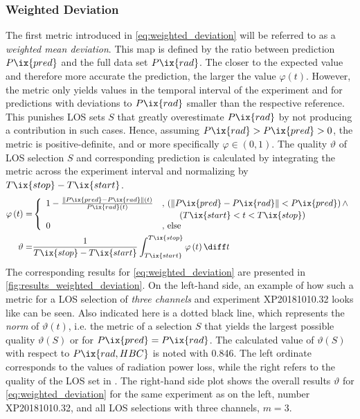            \subsubsection*{Weighted Deviation}%
%
                The first metric introduced in \cref{eq:weighted_deviation} will be referred to as a \textit{weighted mean deviation}. This map is defined by the ratio between prediction $P\ix{pred}$ and the full data set $P\ix{rad}$. The closer to the expected value and therefore more accurate the prediction, the larger the value $\varphi\left(t\right)$. However, the metric only yields values in the temporal interval of the experiment and for predictions with deviations to $P\ix{rad}$ smaller than the respective reference. This punishes LOS sets $S$ that greatly overestimate $P\ix{rad}$ by not producing a contribution in such cases. Hence, assuming $P\ix{rad}>P\ix{pred}>0$, the metric is positive-definite, and or more specifically $\varphi\in\left(0, 1\right)$. The quality $\vartheta$ of LOS selection $S$ and corresponding prediction is calculated by integrating the metric across the experiment interval and normalizing by $T\ix{stop}-T\ix{start}$.%
%
                \begin{align}
                    \begin{split}\label{eq:weighted_deviation}%
                        \varphi\left(t\right)=&\left\{\begin{array}{ll}%
                            1-\frac{\left\|P\ix{pred}-P\ix{rad}\right\|\left(t\right)}{P\ix{rad}\left(t\right)}&,\,\left(\left\|P\ix{pred}-P\ix{rad}\right\|<P\ix{pred}\right)\land\\%
                            &\qquad\left(T\ix{start}<t<T\ix{stop}\right)\\%
                            0&,\,\text{else}%
                        \end{array}\right.\\%
                        \vartheta=&\frac{1}{T\ix{stop}-T\ix{start}}\int_{T\ix{start}}^{T\ix{stop}}\varphi \left(t\right)\diff t%
                    \end{split}%
                \end{align}%
%
                The corresponding results for \cref{eq:weighted_deviation} are presented in \cref{fig:results_weighted_deviation}. On the left-hand side, an example of how such a metric for a LOS selection of \textit{three channels} and experiment XP20181010.32 looks like can be seen. Also indicated here is a dotted black line, which represents the \textit{norm} of $\vartheta\left(t\right)$, i.e. the metric of a selection $S$ that yields the largest possible quality $\vartheta\left(S\right)$ or for $P\ix{pred}=P\ix{rad}$. The calculated value of $\vartheta\left(S\right)$ with respect to $P\ix{rad,HBC}$ is noted with 0.846. The left ordinate corresponds to the values of radiation power loss, while the right refers to the quality of the LOS set in \SI{}{\arbitraryunit}. The right-hand side plot shows the overall results $\vartheta$ for \cref{eq:weighted_deviation} for the same experiment as on the left, number XP20181010.32, and all LOS selections with three channels, $m=3$.\\%
